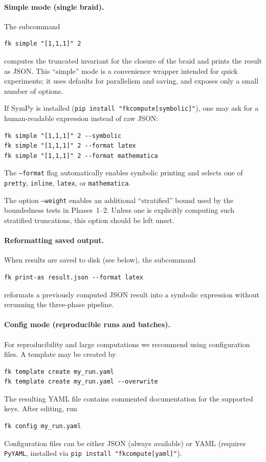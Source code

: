 \documentclass[twocolumn]{article}
\begin{document}
\paragraph{Simple mode (single braid).}
The subcommand
\begin{verbatim}
fk simple "[1,1,1]" 2
\end{verbatim}
computes the truncated invariant for the closure of the braid and prints the
result as JSON.  This ``simple'' mode is a convenience wrapper intended for
quick experiments; it uses defaults for parallelism and saving, and exposes
only a small number of options.

If SymPy is installed (\texttt{pip install "fkcompute[symbolic]"}), one may ask
for a human-readable expression instead of raw JSON:
\begin{verbatim}
fk simple "[1,1,1]" 2 --symbolic
fk simple "[1,1,1]" 2 --format latex
fk simple "[1,1,1]" 2 --format mathematica
\end{verbatim}
The \texttt{--format} flag automatically enables symbolic printing and selects
one of \texttt{pretty}, \texttt{inline}, \texttt{latex}, or \texttt{mathematica}.

The option \texttt{--weight} enables an additional ``stratified'' bound used by
the boundedness tests in Phases~1--2.  Unless one is explicitly computing such
stratified truncations, this option should be left unset.

\paragraph{Reformatting saved output.}
When results are saved to disk (see below), the subcommand
\begin{verbatim}
fk print-as result.json --format latex
\end{verbatim}
reformats a previously computed JSON result into a symbolic expression without
rerunning the three-phase pipeline.

\paragraph{Config mode (reproducible runs and batches).}
For reproducibility and large computations we recommend using configuration
files.  A template may be created by
\begin{verbatim}
fk template create my_run.yaml
fk template create my_run.yaml --overwrite
\end{verbatim}
The resulting YAML file contains commented documentation for the supported
keys.  After editing, run
\begin{verbatim}
fk config my_run.yaml
\end{verbatim}
Configuration files can be either JSON (always available) or YAML (requires
\texttt{PyYAML}, installed via \texttt{pip install "fkcompute[yaml]"}).
\end{document}
